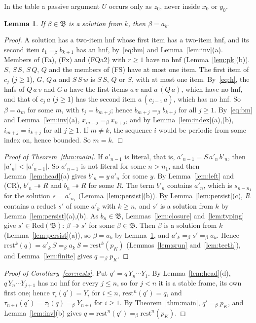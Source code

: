 \documentclass[11pt]{amsart}
\newtheorem{lemma}[theorem]{Lemma}
\theoremstyle{definition}
\newcommand{\red}{\twoheadrightarrow}
\newcommand{\conv}{=_\beta}
\newcommand{\sz}[1]{\lvert#1\rvert}
\newcommand{\rest}{\mathrm{rest}}
\newcommand{\pK}{p_K}
\newcommand{\B}{\mathfrak B}
\newcommand{\Red}{\mathrm{Red}}
\begin{document}
\noindent In the table a passive argument $U$ occurs only as $z_0$, never inside $x_0$ or $y_0$.

\begin{lemma}\label{lem:sol}
If $\beta\in\B$ is a solution from $k$, then $\beta=a_k$.
\end{lemma}

\begin{proof}
A solution has a two-item hnf whose first item has a two-item hnf, and its second item $t_1\conv b_{k+1}$
has an hnf, by~\eqref{eq:bm} and Lemma~\ref{lem:inv}(a). Members of (Fa), (Fx) and (FQa2) with
$r\ge1$ have no hnf (Lemma~\ref{lem:pk}(b)). $S$, $S\,S$, $S\,Q$, $Q$ and the members of (FS) have at
most one item. The first item of $c_j$ ($j\ge1$), $G$, $Q\,a$ and $S\,S\,w$ is $S\,S$, $Q$ or $S$, with at
most one item. By~\eqref{eq:h}, the hnfs of $Q\,a\,v$ and $G\,a$ have the first items $a\,v$ and $a\,(Q\,a)$, which
have no hnf, and that of $c_j\,a$ ($j\ge1$) has the second item $a\,(c_{j-1}\,a)$, which has no hnf. So
$\beta=a_m$ for some $m$, with $t_j=b_{m+j}$; hence $b_{m+j}\conv b_{k+j}$ for all $j\ge1$.
By~\eqref{eq:bm} and Lemma~\ref{lem:inv}(a), $x_{m+j}\conv x_{k+j}$, and by
Lemma~\ref{lem:index}(a),(b), $i_{m+j}=i_{k+j}$ for all $j\ge1$. If $m\ne k$, the sequence $i$ would
be periodic from some index on, hence bounded. So $m=k$.
\end{proof}

\begin{proof}[Proof of Theorem~\ref{thm:main}]
If $a'_{n-1}$ is literal, that is, $a'_{n-1}=S\,a'_n\,b'_n$, then $\sz{a'_n}<\sz{a'_{n-1}}$. So
$a'_{n-1}$ is not literal for some $n>n_1$, and then Lemma~\ref{lem:head}(a) gives $b'_n=y\,a'_n$ for some $y$. By
Lemma~\ref{lem:left} and (CR), $b'_n\red R$ and $b_n\red R$ for some $R$. The term $b'_n$ contains
$a'_n$, which is $s_{n-n_1}$ for the solution $s=a'_{n_1}$ (Lemma~\ref{lem:persist}(b)). By
Lemma~\ref{lem:persist}(c), $R$ contains a reduct $s'$ of some $a'_k$ with $k\ge n$, and $s'$ is a
solution from $k$ by Lemma~\ref{lem:persist}(a),(b). As $b_n\in\B$, Lemmas~\ref{lem:closure}
and~\ref{lem:typing} give $s'\in\Red(\B)$: $\beta\red s'$ for some $\beta\in\B$. Then $\beta$ is a
solution from $k$ (Lemma~\ref{lem:persist}(a)), so $\beta=a_k$ by Lemma~\ref{lem:sol}, and
$a'_k\conv s'\conv a_k$. Hence $\rest^k(q)=a'_k\,S\conv a_k\,S=\rest^k(\pK)$ (Lemmas~\ref{lem:srun}
and~\ref{lem:teeth}), and Lemma~\ref{lem:finite} gives $q\conv\pK$.
\end{proof}

\begin{proof}[Proof of Corollary~\ref{cor:rests}]
Put $q'=q\,Y_n\cdots Y_1$. By Lemma~\ref{lem:head}(d), $q\,Y_n\cdots Y_{j+1}$ has no hnf for every
$j\le n$, so for $j<n$ it is a stable frame, its own first one; hence $\tau_i(q')=Y_i$ for $i\le n$,
$\rest^n(q')=q$, and $\tau_{n+i}(q')=\tau_i(q)\conv Y_{n+i}$ for $i\ge1$. By Theorem~\ref{thm:main},
$q'\conv\pK$, and Lemma~\ref{lem:inv}(b) gives $q=\rest^n(q')\conv\rest^n(\pK)$.
\end{proof}
\end{document}
